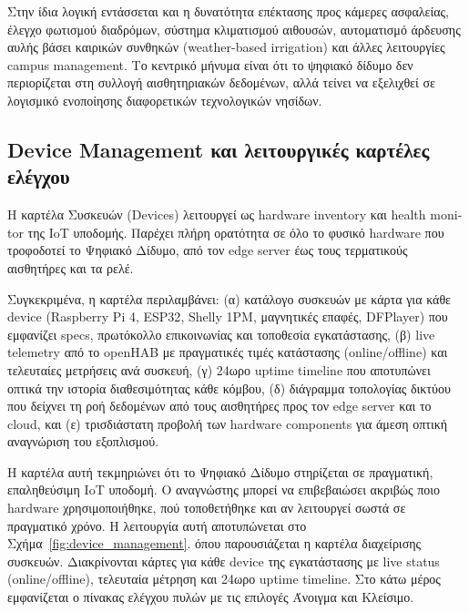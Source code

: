 Στην ίδια λογική εντάσσεται και η δυνατότητα επέκτασης προς κάμερες ασφαλείας, έλεγχο φωτισμού διαδρόμων, σύστημα κλιματισμού αιθουσών, αυτοματισμό άρδευσης αυλής βάσει καιρικών συνθηκών (\textlatin{weather-based irrigation}) και άλλες λειτουργίες \textlatin{campus management}. Το κεντρικό μήνυμα είναι ότι το ψηφιακό δίδυμο δεν περιορίζεται στη συλλογή αισθητηριακών δεδομένων, αλλά τείνει να εξελιχθεί σε λογισμικό ενοποίησης διαφορετικών τεχνολογικών νησίδων.

\subsection{\texorpdfstring{\textlatin{Device Management} και λειτουργικές καρτέλες ελέγχου}{Device Management και λειτουργικές καρτέλες ελέγχου}}
Η καρτέλα Συσκευών (\textlatin{Devices}) λειτουργεί ως \textlatin{hardware inventory} και \textlatin{health monitor} της \textlatin{IoT} υποδομής. Παρέχει πλήρη ορατότητα σε όλο το φυσικό \textlatin{hardware} που τροφοδοτεί το Ψηφιακό Δίδυμο, από τον \textlatin{edge server} έως τους τερματικούς αισθητήρες και τα ρελέ.

Συγκεκριμένα, η καρτέλα περιλαμβάνει: (α) κατάλογο συσκευών με κάρτα για κάθε \textlatin{device} (\textlatin{Raspberry Pi 4}, \textlatin{ESP32}, \textlatin{Shelly 1PM}, μαγνητικές επαφές, \textlatin{DFPlayer}) που εμφανίζει \textlatin{specs}, πρωτόκολλο επικοινωνίας και τοποθεσία εγκατάστασης, (β) \textlatin{live telemetry} από το \textlatin{openHAB} με πραγματικές τιμές κατάστασης (\textlatin{online/offline}) και τελευταίες μετρήσεις ανά συσκευή, (γ) 24ωρο \textlatin{uptime timeline} που αποτυπώνει οπτικά την ιστορία διαθεσιμότητας κάθε κόμβου, (δ) διάγραμμα τοπολογίας δικτύου που δείχνει τη ροή δεδομένων από τους αισθητήρες προς τον \textlatin{edge server} και το \textlatin{cloud}, και (ε) τρισδιάστατη προβολή των \textlatin{hardware components} για άμεση οπτική αναγνώριση του εξοπλισμού.

Η καρτέλα αυτή τεκμηριώνει ότι το Ψηφιακό Δίδυμο στηρίζεται σε πραγματική, επαληθεύσιμη \textlatin{IoT} υποδομή. Ο αναγνώστης μπορεί να επιβεβαιώσει ακριβώς ποιο \textlatin{hardware} χρησιμοποιήθηκε, πού τοποθετήθηκε και αν λειτουργεί σωστά σε πραγματικό χρόνο. Η λειτουργία αυτή αποτυπώνεται στο Σχήμα~\ref{fig:device_management}. όπου παρουσιάζεται η καρτέλα διαχείρισης συσκευών. Διακρίνονται κάρτες για κάθε \textlatin{device} της εγκατάστασης με \textlatin{live status} (\textlatin{online/offline}), τελευταία μέτρηση και 24ωρο \textlatin{uptime timeline}. Στο κάτω μέρος εμφανίζεται ο πίνακας ελέγχου πυλών με τις επιλογές Άνοιγμα και Κλείσιμο.


